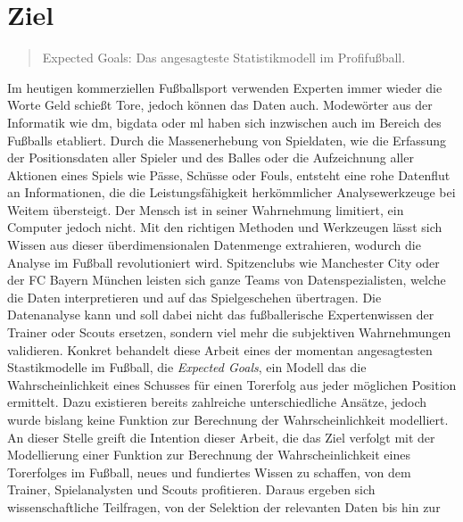 \section{Ziel}

\begin{quote} 
\glqq Expected Goals: Das angesagteste Statistikmodell im Profifußball.\grqq{}
\end{quote}

Im heutigen kommerziellen Fußballsport verwenden Experten immer wieder die Worte \glqq Geld schießt Tore\grqq, jedoch können das Daten auch. Modewörter aus der Informatik wie \gls{dm}, \gls{bigdata} oder \gls{ml} haben sich inzwischen auch im Bereich des Fußballs etabliert. Durch die Massenerhebung von Spieldaten, wie die Erfassung der Positionsdaten aller Spieler und des Balles oder die Aufzeichnung aller Aktionen eines Spiels wie Pässe, Schüsse oder Fouls, entsteht eine rohe Datenflut an Informationen, die die Leistungsfähigkeit herkömmlicher Analysewerkzeuge bei Weitem übersteigt. Der Mensch ist in seiner Wahrnehmung limitiert, ein Computer jedoch nicht. Mit den richtigen Methoden und Werkzeugen lässt sich Wissen aus dieser überdimensionalen Datenmenge extrahieren, wodurch die Analyse im Fußball revolutioniert wird. Spitzenclubs wie Manchester City oder der FC Bayern München leisten sich ganze Teams von Datenspezialisten, welche die Daten interpretieren und auf
das Spielgeschehen übertragen. Die Datenanalyse kann und soll dabei nicht das fußballerische Expertenwissen der Trainer oder Scouts ersetzen, sondern viel mehr die subjektiven Wahrnehmungen validieren. Konkret behandelt diese Arbeit eines der momentan angesagtesten Stastikmodelle im Fußball, die \textit{Expected Goals}, ein Modell das die Wahrscheinlichkeit eines Schusses für einen Torerfolg aus jeder möglichen Position ermittelt. Dazu existieren bereits zahlreiche unterschiedliche Ansätze, jedoch wurde bislang keine Funktion zur Berechnung der Wahrscheinlichkeit modelliert. An dieser Stelle greift die Intention dieser Arbeit, die das Ziel verfolgt mit der Modellierung einer Funktion zur Berechnung der Wahrscheinlichkeit eines Torerfolges im Fußball, neues und fundiertes Wissen zu schaffen, von dem Trainer, Spielanalysten und Scouts profitieren. Daraus ergeben sich wissenschaftliche Teilfragen, von der Selektion der relevanten Daten bis hin zur 
	